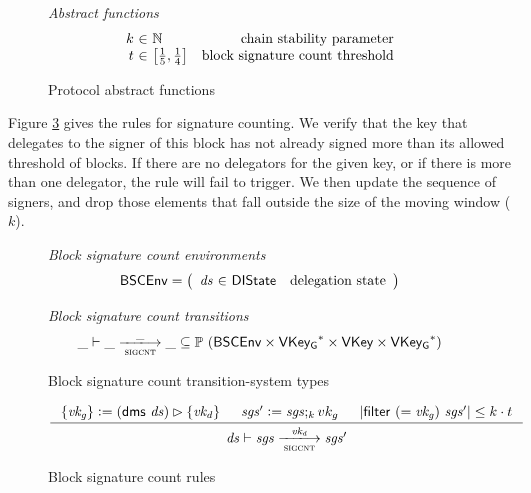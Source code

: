 \documentclass[11pt,a4paper]{article}
\newcommand{\powerset}[1]{\mathbb{P}~#1}
\newcommand{\restrictrange}{\rhd}
\newcommand{\var}[1]{\mathit{#1}}
\newcommand{\fun}[1]{\mathsf{#1}}
\newcommand{\type}[1]{\mathsf{#1}}
\newcommand{\size}[1]{\left| #1 \right|}
\newcommand{\trans}[2]{\xlongrightarrow[\textsc{#1}]{#2}}
\newcommand{\seqof}[1]{#1^{*}}
\newcommand{\leteq}{\ensuremath{\mathrel{\mathop:}=}}
\newcommand{\VKey}{\type{VKey}}
\newcommand{\VKeyGen}{\type{VKey_G}}
\newcommand{\DelegState}{\type{DIState}}
\begin{document}
\begin{figure}[ht]
  \emph{Abstract functions}
  \begin{equation*}
    \begin{array}{r@{~\in~}lr}
      k & \mathbb{N} & \text{chain stability parameter}\\
      t & \left[\frac{1}{5}, \frac{1}{4}\right] & \text{block signature count threshold}\\
    \end{array}
  \end{equation*}

  \caption{Protocol abstract functions}
  \label{fig:defs:proto-abstract-funcs}
\end{figure}


Figure \ref{fig:rules:sigcnt} gives the rules for signature counting. We verify
that the key that delegates to the signer of this block has not already signed
more than its allowed threshold of blocks. If there are no delegators for the
given key, or if there is more than one delegator, the rule will fail to trigger.
%
We then update the sequence of signers, and drop those elements that fall
outside the size of the moving window ($k$).

\begin{figure}[ht]
  \emph{Block signature count environments}
  \begin{equation*}
    \BSCEnv =
    \left(
      \begin{array}{r@{~\in~}lr}
        \var{ds} & \DelegState & \text{delegation state} \\
      \end{array}
    \right)
  \end{equation*}

  \emph{Block signature count transitions}
  \begin{equation*}
    \_ \vdash \var{\_} \trans{sigcnt}{\_} \var{\_} \subseteq
    \powerset (\BSCEnv \times \seqof{\VKeyGen} \times \VKey \times \seqof{\VKeyGen})
  \end{equation*}
  \caption{Block signature count transition-system types}
  \label{fig:ts-types:sigcnt}
\end{figure}

\begin{figure}[ht]
  \begin{equation*}
    \inference
    {
      \{\var{vk_g}\} \leteq (\fun{dms} ~ \var{ds}) \restrictrange \{\var{vk_d}\}
      & \var{sgs'} \leteq \var{sgs};_k {vk_g} &
      \size{\fun{filter}~(=\var{vk_g})~\var{sgs'}} \leq k \cdot t \\
    }
    {
      \var{ds}
      \vdash
      {\var{sgs}}
      \trans{sigcnt}{\var{vk_d}}
      {\var{sgs'}}
    }
   \label{eq:rule:sigcnt}
 \end{equation*}
 \caption{Block signature count rules}
 \label{fig:rules:sigcnt}
\end{figure}
\end{document}
